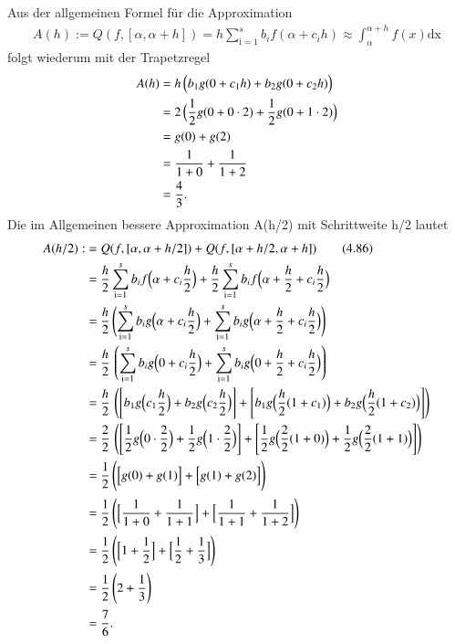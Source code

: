 \documentclass[10pt,a4paper]{article}
\begin{document}
	
	Aus der allgemeinen Formel für die Approximation
	\begin{align*}\tag{4.85, S. 99}
		A(h):=Q(f,[\alpha,\alpha+h])=h\sum_{\text{i}=1}^{s}b_if(\alpha+c_ih)\approx\int_{\alpha}^{\alpha+h}f(x)\text{dx}
	\end{align*}
	folgt wiederum mit der Trapetzregel
	\begin{align*}
		A(h)&=h\,\Bigl( b_1g(0+c_1h) + b_2g(0+c_2h)\Bigr) \\
		&=2\,\Bigl( \frac{1}{2}g(0+0\cdot 2) + \frac{1}{2}g(0+1\cdot 2)\Bigr) \\
		&=g(0) + g(2) \\
		&=\frac{1}{1+0} + \frac{1}{1+2} \\
		&=\frac{4}{3}.
	\end{align*}
	Die im Allgemeinen bessere Approximation A(h/2) mit Schrittweite h/2 lautet
	\begin{align*}
		A(h/2):&=Q(f,[\alpha,\alpha+h/2])+Q(f,[\alpha+h/2,\alpha+h]) \tag{4.86} \\
		&=\frac{h}{2}\sum_{\text{i}=1}^{s}b_if\Bigl(\alpha+c_i\frac{h}{2}\Bigr) + \frac{h}{2}\sum_{\text{i}=1}^{s}b_if\Bigl(\alpha+\frac{h}{2}+c_i\frac{h}{2}\Bigr) \\
		&= \frac{h}{2}\,\Biggl(
				\sum_{\text{i}=1}^{s}b_ig\Bigl(\alpha+c_i\frac{h}{2}\Bigr) + \sum_{\text{i}=1}^{s}b_ig\Bigl(\alpha+\frac{h}{2}+c_i\frac{h}{2}\Bigr)
		   \Biggr) \\
		&= \frac{h}{2}\,\left(
			\sum_{\text{i}=1}^{s}b_ig\Bigl(0+c_i\frac{h}{2}\Bigr) +  \sum_{\text{i}=1}^{s}b_ig\Bigl(0+\frac{h}{2}+c_i\frac{h}{2}\Bigr)
		   \right) \\
		&= \frac{h}{2}\,\left(
			\left[b_1g\Bigl(c_1\frac{h}{2}\Bigr) + b_2g\Bigl(c_2\frac{h}{2}\Bigr) \right]+  	\left[b_1g\Bigl(\frac{h}{2}(1+c_1)\Bigr) +b_2g\Bigl(\frac{h}{2}(1+c_2)\Bigr) \right]
		   \right) \\
		&= \frac{2}{2}\,\left(
			\left[\frac{1}{2}g\Bigl(0\cdot\frac{2}{2}\Bigr) + \frac{1}{2}g\Bigl(1\cdot\frac{2}{2}\Bigr) \right]+\left[\frac{1}{2}g\Bigl(\frac{2}{2}(1+0)\Bigr) +\frac{1}{2}g\Bigl(\frac{2}{2}(1+1)\Bigr) \right]
		   \right) \\
		&= \frac{1}{2}\,\Biggl( \Bigl[g(0) + g(1)\Bigr] + \Bigl[g(1) + g(2)\Bigr] \Biggr) \\
		&= \frac{1}{2}\,\Biggl( \Bigl[\frac{1}{1+0} + \frac{1}{1+1}\Bigr] + \Bigl[\frac{1}{1+1} + \frac{1}{1+2}\Bigr] \Biggr) \\
		&= \frac{1}{2}\,\Biggl( \Bigl[1 + \frac{1}{2}\Bigr] + \Bigl[\frac{1}{2} + \frac{1}{3}\Bigr] \Biggr) \\
		&= \frac{1}{2}\,\Biggl(2 + \frac{1}{3} \Biggr) \\
		&= \frac{7}{6}.\\
	\end{align*}
\end{document}
